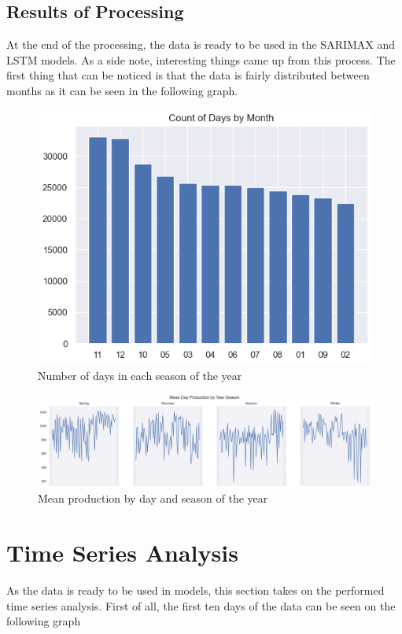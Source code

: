 \documentclass[a4paper,12pt]{article}
\begin{document}
\subsection{Results of Processing}
At the end of the processing, the data is ready to be used in the SARIMAX and LSTM models. As a side note, interesting things came up from this process. The first thing that can be noticed is that the data is fairly distributed between months as it can be seen in the following graph.

\begin{figure}[H] %
    \centering %
    \includegraphics[height=0.40\textwidth]{conteo.png} %
    \caption{Number of days in each season of the year} %
    \label{fig:etiqueta_imagen} %
\end{figure}

\begin{figure}[H] %
    \centering %
    \includegraphics[width=1\textwidth]{temporada.png} %
    \caption{Mean production by day and season of the year} %
    \label{fig:etiqueta_imagen} %
\end{figure}

\section{Time Series Analysis}
As the data is ready to be used in models, this section takes on the performed time series analysis. First of all, the first ten days of the data can be seen on the following graph
\end{document}
